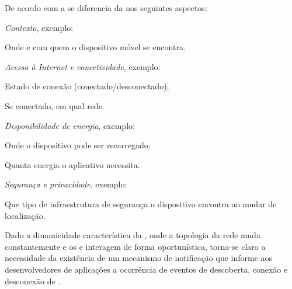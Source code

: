 De acordo com  a \iomt{} se diferencia da \iot{} nos seguintes aspectos:
\begin{alineas}

	\item \emph{Contexto}, exemplo:
		
		\begin{alineas}

			\item Onde e com quem o dispositivo móvel se encontra.

		\end{alineas}

	\item \emph{Acesso à Internet e conectividade}, exemplo:
		
		\begin{alineas}

			\item Estado de conexão (conectado/desconectado);
				
			\item Se conectado, em qual rede.

		\end{alineas}

	\item \emph{Disponibilidade de energia}, exemplo:
		
		\begin{alineas}

			\item Onde o dispositivo pode ser recarregado;
				
			\item Quanta energia o aplicativo necessita.

		\end{alineas}

	\item \emph{Segurança e privacidade}, exemplo:
		
		\begin{alineas}

			\item Que tipo de infraestrutura de segurança o dispositivo encontra ao mudar de localização.

		\end{alineas}

\end{alineas}

Dado a dinamicidade característica da \iomt{}, onde a topologia da rede muda constantemente e os \smartobjs{} e \gateways{} interagem de forma oportunística, torna-se claro a necessidade da existência de um mecanismo de notificação que informe aos desenvolvedores de aplicações a ocorrência de eventos de descoberta, conexão e desconexão de \smartobjs{}.

